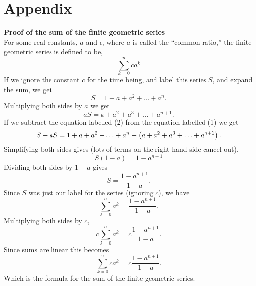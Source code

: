 \section{Appendix} \label{appendixD}
\textbf{Proof of the sum of the finite geometric series}\bigskip \\

\noindent For some real constants, $a$ and $c$, where $a$ is called the ``common ratio,'' the finite geometric series is defined to be,
\[
\sum_{k=0}^n ca^k \tag{where $n$ is some natural number}
\]
If we ignore the constant $c$ for the time being, and label this series $S$, and expand the sum, we get
\[
S = 1 + a + a^2 + \ldots + a^n. \tag{1}
\]
Multiplying both sides by $a$ we get
\[
aS = a + a^2 + a^3 + \ldots + a^{n+1}. \tag{2}
\]
If we subtract the equation labelled (2) from the equation labelled (1) we get
\[
S - aS = 1 + a + a^2 + \ldots + a^n - \left(a + a^2 + a^3 + \ldots + a^{n+1}\right).
\]
Simplifying both sides gives (lots of terms on the right hand side cancel out),
\[
S(1-a) = 1 - a^{n+1}
\]
Dividing both sides by $1-a$ gives
\[
S = \frac{1-a^{n+1}}{1-a}.
\]
Since $S$ was just our label for the series (ignoring $c$), we have
\[
\sum_{k=0}^n a^k = \frac{1-a^{n+1}}{1-a}.
\]
Multiplying both sides by $c$,
\[
c\sum_{k=0}^n a^k = c\frac{1-a^{n+1}}{1-a}.
\]
Since sums are linear this becomes
\[
\sum_{k=0}^n ca^k = c\frac{1-a^{n+1}}{1-a}.
\]
Which is the formula for the sum of the finite geometric series.